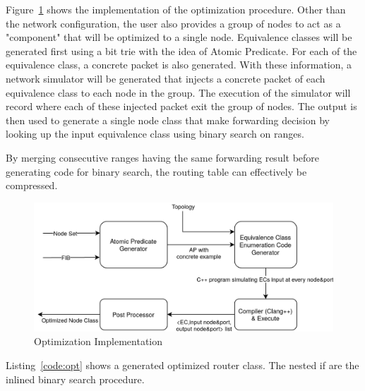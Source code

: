\documentclass[letterpaper, 10 pt, conference]{ieeeconf}  %
\begin{document}
Figure~\ref{fig:opt} shows the implementation of the optimization procedure. Other than the network configuration, the user also provides a group of nodes to act as a "component" that will be optimized to a single node. Equivalence classes will be generated first using a bit trie with the idea of Atomic Predicate. For each of the equivalence class, a concrete packet is also generated. With these information, a network simulator will be generated that injects a concrete packet of each equivalence class to each node in the group. The execution of the simulator will record where each of these injected packet exit the group of nodes. The output is then used to generate a single node class that make forwarding decision by looking up the input equivalence class using binary search on ranges.

By merging consecutive ranges having the same forwarding result before generating code for binary search, the routing table can effectively be compressed.

\begin{figure}[]
 \centering
 \includegraphics[width=\linewidth]{optimization.png}
 \caption{Optimization Implementation}
 \label{fig:opt}
\end{figure}

Listing~\ref{code:opt} shows a generated optimized router class. The nested if are the inlined binary search procedure.
\end{document}
